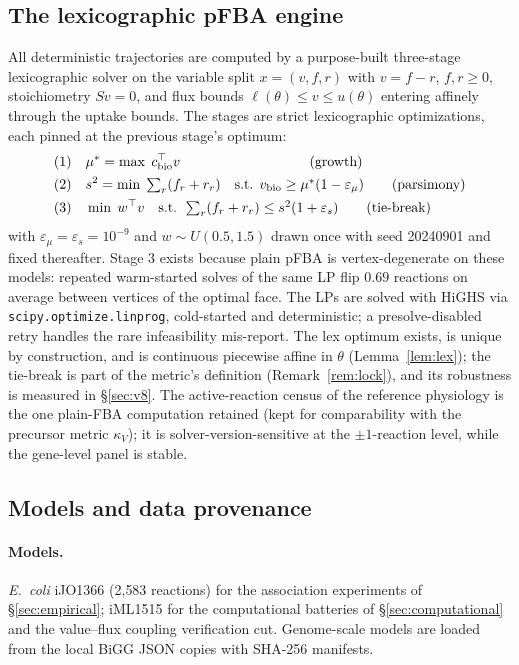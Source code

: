 \documentclass[11pt,a4paper]{article}
\theoremstyle{plain}
\theoremstyle{definition}
\theoremstyle{remark}
\newcommand{\kk}{\kappa_{\!V}}
\begin{document}
\subsection{The lexicographic pFBA engine}\label{sec:engine}

All deterministic trajectories are computed by a purpose-built
three-stage lexicographic solver on the variable split $x = (v, f,
r)$ with $v = f - r$, $f, r \ge 0$, stoichiometry $Sv = 0$, and
flux bounds $\ell(\theta) \le v \le u(\theta)$ entering affinely
through the uptake bounds. The stages are strict lexicographic
optimizations, each pinned at the previous stage's optimum:
\begin{align}
\text{(1)}\quad & \mu^* = \max\; c_{\mathrm{bio}}^\top v
  \qquad\qquad\qquad\qquad\quad\; \text{(growth)} \notag\\
\text{(2)}\quad & s^2 = \min\; \textstyle\sum_r (f_r + r_r)
  \quad\text{s.t. } v_{\mathrm{bio}} \ge \mu^*(1 - \varepsilon_\mu)
  \qquad \text{(parsimony)} \notag\\
\text{(3)}\quad & \min\; w^\top v
  \quad\text{s.t. } \textstyle\sum_r (f_r + r_r) \le s^2(1 +
  \varepsilon_s) \qquad \text{(tie-break)} \notag
\end{align}
with $\varepsilon_\mu = \varepsilon_s = 10^{-9}$ and $w \sim U(0.5, 1.5)$ drawn once with seed 20240901 and fixed thereafter.
Stage 3 exists because plain pFBA is vertex-degenerate on these
models: repeated warm-started solves of the same LP flip $0.69$
reactions on average between vertices of the optimal face. The LPs
are solved with HiGHS
\citep{huangfu2018} via \texttt{scipy.optimize.linprog}, cold-started
and deterministic; a presolve-disabled retry handles the rare
infeasibility mis-report. The lex optimum exists, is unique by
construction, and is continuous piecewise affine in $\theta$
(Lemma~\ref{lem:lex}); the tie-break is part of the metric's
definition (Remark~\ref{rem:lock}), and its robustness is measured in \S\ref{sec:v8}. The active-reaction census of the reference physiology is the one plain-FBA computation retained (kept for comparability with the precursor metric $\kk$); it is solver-version-sensitive at the $\pm 1$-reaction
level, while the gene-level panel is stable.

\subsection{Models and data provenance}\label{sec:data}

\paragraph{Models.} \emph{E.~coli} iJO1366 (2{,}583 reactions) \citep{orth2011} for the association experiments of \S\ref{sec:empirical}; iML1515 \citep{monk2017} for the computational batteries of \S\ref{sec:computational} and the value--flux coupling verification cut. Genome-scale models are
loaded from the local BiGG JSON copies with SHA-256 manifests.
\end{document}
